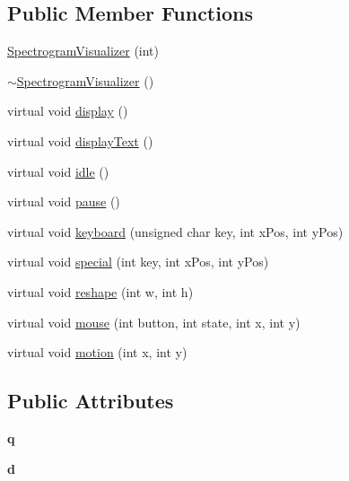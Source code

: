 \subsection*{Public Member Functions}
\begin{DoxyCompactItemize}
\item 
\hyperlink{structSpectrogramVisualizer_a0b57309d58a075208d6c784718b3e6d7}{Spectrogram\+Visualizer} (int)
\item 
\hyperlink{structSpectrogramVisualizer_a2b55364382a4ee290918a05946505561}{$\sim$\+Spectrogram\+Visualizer} ()
\item 
virtual void \hyperlink{structSpectrogramVisualizer_a529c64c733ffc564764593329c483ae2}{display} ()
\item 
virtual void \hyperlink{structSpectrogramVisualizer_a9b9aa780d95f710b1c876ce49abac9a1}{display\+Text} ()
\item 
virtual void \hyperlink{structSpectrogramVisualizer_a669c19fe9dc24dc89e1cc518edb24de6}{idle} ()
\item 
virtual void \hyperlink{structSpectrogramVisualizer_a301989369e63d88cd6a59d12c23b4551}{pause} ()
\item 
virtual void \hyperlink{structSpectrogramVisualizer_a2901f4ea1e35d4c7e6660f6c19ed468f}{keyboard} (unsigned char key, int x\+Pos, int y\+Pos)
\item 
virtual void \hyperlink{structSpectrogramVisualizer_a631d3522ef8d8bdc6fd9ba9acf2f15ec}{special} (int key, int x\+Pos, int y\+Pos)
\item 
virtual void \hyperlink{structSpectrogramVisualizer_a789c6b59ab3a6960056eaab014163b91}{reshape} (int w, int h)
\item 
virtual void \hyperlink{structSpectrogramVisualizer_a949b2e0bfd260e6f8d63b5867f1b4edf}{mouse} (int button, int state, int x, int y)
\item 
virtual void \hyperlink{structSpectrogramVisualizer_a8ab333867c86cfa188ff026410e271aa}{motion} (int x, int y)
\end{DoxyCompactItemize}
\subsection*{Public Attributes}
\begin{DoxyCompactItemize}
\item 
\hypertarget{structSpectrogramVisualizer_add6b6c6e7a1768bd6fef3256f1cb26bc}{}\label{structSpectrogramVisualizer_add6b6c6e7a1768bd6fef3256f1cb26bc} 
{\bfseries q}
\item 
\hypertarget{structSpectrogramVisualizer_a969c09495e18bec03ba7145b967b6cf7}{}\label{structSpectrogramVisualizer_a969c09495e18bec03ba7145b967b6cf7} 
{\bfseries d}
\end{DoxyCompactItemize}

